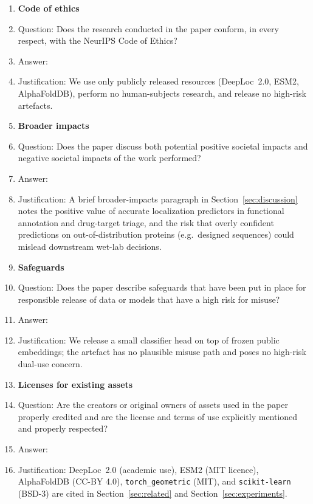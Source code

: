 \begin{enumerate}
\item {\bf Code of ethics}
    \item[] Question: Does the research conducted in the paper conform, in every respect, with the NeurIPS Code of Ethics?
    \item[] Answer: \answerYes{}
    \item[] Justification: We use only publicly released resources (DeepLoc~2.0,
    ESM2, AlphaFoldDB), perform no human-subjects research, and release no
    high-risk artefacts.

\item {\bf Broader impacts}
    \item[] Question: Does the paper discuss both potential positive societal impacts and negative societal impacts of the work performed?
    \item[] Answer: \answerYes{}
    \item[] Justification: A brief broader-impacts paragraph in
    Section~\ref{sec:discussion} notes the positive value of accurate
    localization predictors in functional annotation and drug-target
    triage, and the risk that overly confident predictions on
    out-of-distribution proteins (e.g.\ designed sequences) could mislead
    downstream wet-lab decisions.

\item {\bf Safeguards}
    \item[] Question: Does the paper describe safeguards that have been put in place for responsible release of data or models that have a high risk for misuse?
    \item[] Answer: \answerNA{}
    \item[] Justification: We release a small classifier head on top of frozen
    public embeddings; the artefact has no plausible misuse path and poses no
    high-risk dual-use concern.

\item {\bf Licenses for existing assets}
    \item[] Question: Are the creators or original owners of assets used in the paper properly credited and are the license and terms of use explicitly mentioned and properly respected?
    \item[] Answer: \answerYes{}
    \item[] Justification: DeepLoc~2.0 (academic use), ESM2 (MIT licence),
    AlphaFoldDB (CC-BY 4.0), \texttt{torch\_geometric} (MIT), and
    \texttt{scikit-learn} (BSD-3) are cited in
    Section~\ref{sec:related} and Section~\ref{sec:experiments}.


\end{enumerate}
